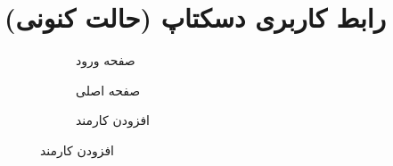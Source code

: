 \documentclass[a4paper,12pt]{report}
\begin{document}
	\pagebreak
	\section{
		رابط کاربری دسکتاپ (حالت کنونی)
	}\label{sec2:chap3}
	
	\begin{figure}[!h]
		\centering
		\footnotesize
		\begin{subfigure}[t]{0.3\linewidth}
			\caption{
				صفحه ورود}
		\end{subfigure}\hfill%
		\begin{subfigure}[t]{0.3\linewidth}
			\caption{
				صفحه اصلی}
		\end{subfigure}\hfill%
		\begin{subfigure}[t]{0.3\linewidth}
			\caption{
				افزودن کارمند}
		\end{subfigure}


\end{figure}
\end{document}

